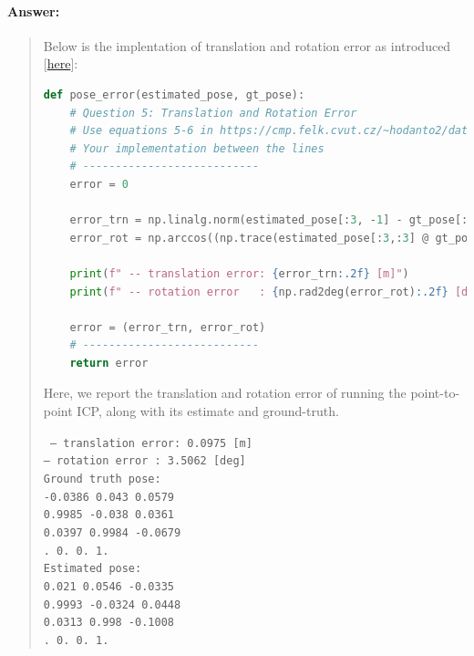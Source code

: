 \documentclass[11pt]{article}
\begin{document}
\paragraph{Answer:} 
\begin{quote}

Below is the implentation of translation and rotation error as introduced [\href{https://cmp.felk.cvut.cz/~hodanto2/data/hodan2016evaluation.pdf}{here}]:

\begin{lstlisting}[language=Python, basicstyle=\scriptsize]
def pose_error(estimated_pose, gt_pose):
    # Question 5: Translation and Rotation Error 
    # Use equations 5-6 in https://cmp.felk.cvut.cz/~hodanto2/data/hodan2016evaluation.pdf
    # Your implementation between the lines
    # ---------------------------
    error = 0
  
    error_trn = np.linalg.norm(estimated_pose[:3, -1] - gt_pose[:3, -1])
    error_rot = np.arccos((np.trace(estimated_pose[:3,:3] @ gt_pose[:3,:3].T) - 1) / 2)
    
    print(f" -- translation error: {error_trn:.2f} [m]")
    print(f" -- rotation error   : {np.rad2deg(error_rot):.2f} [deg]")
    
    error = (error_trn, error_rot)
    # ---------------------------
    return error
\end{lstlisting}

Here, we report the translation and rotation error of running the point-to-point ICP, along with its estimate and ground-truth.

{\tt
-- translation error: 0.0975 [m]    \\
-- rotation error   : 3.5062 [deg]  \\
Ground truth pose:  \\
\lbrack {} -0.0386  0.043   0.0579 \rbrack \\
  0.9985 -0.038   0.0361 \rbrack \\
  0.0397  0.9984 -0.0679 \rbrack \\
.      0.      0.      1.     \rbrack \rbrack \\
Estimated pose: \\
\lbrack {}  0.021   0.0546 -0.0335 \rbrack \\
  0.9993 -0.0324  0.0448 \rbrack \\
  0.0313  0.998  -0.1008 \rbrack \\
.      0.      0.      1.     \rbrack \rbrack \\
}


\end{quote}
\end{document}
